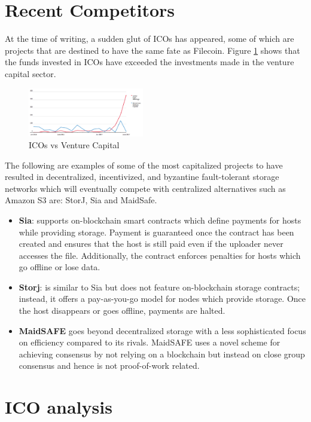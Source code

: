 \documentclass[conference]{IEEEtran}
\begin{document}
\section{Recent Competitors}
\label{sec:recent-competitors}
At the time of writing, a sudden glut of ICOs has appeared, some of which are projects that are destined to have the same fate as Filecoin.
Figure \ref{fig:ico-vs-venture} shows that the funds invested in ICOs have exceeded the investments made in the venture capital sector.
\begin{figure}[h]
\centering
\includegraphics[width=0.45\textwidth]{ico-vs-venture}
\caption{ICOs vs Venture Capital \cite{ico-vs-venture}}
\label{fig:ico-vs-venture}
\end{figure}
The following are examples of some of the most capitalized projects to have resulted in decentralized, incentivized, and byzantine fault-tolerant storage networks which will eventually compete with centralized alternatives such as Amazon S3\cite{amazon-s3} are: StorJ\cite{storj}, Sia\cite{sia} and MaidSafe\cite{maidsafe}.
\begin{itemize}
\item \textbf{Sia}: supports on-blockchain smart contracts which define payments for hosts while providing storage. 
Payment is guaranteed once the contract has been created and ensures that the host is still paid even if the uploader never accesses the file. 
Additionally, the contract enforces penalties for hosts which go offline or lose data.
\item \textbf{Storj}: is similar to Sia but does not feature on-blockchain storage contracts; instead, it offers a pay-as-you-go model for nodes which provide storage. 
Once the host disappears or goes offline, payments are halted.
\item \textbf{MaidSAFE} goes beyond decentralized storage with a less sophisticated focus on efficiency compared to its rivals.
MaidSAFE uses a novel scheme for achieving consensus by not relying on a blockchain but instead on close group consensus and hence is not proof-of-work related.

\end{itemize}

\section{ICO analysis}
\label{sec:ico-analysis}
\end{document}
